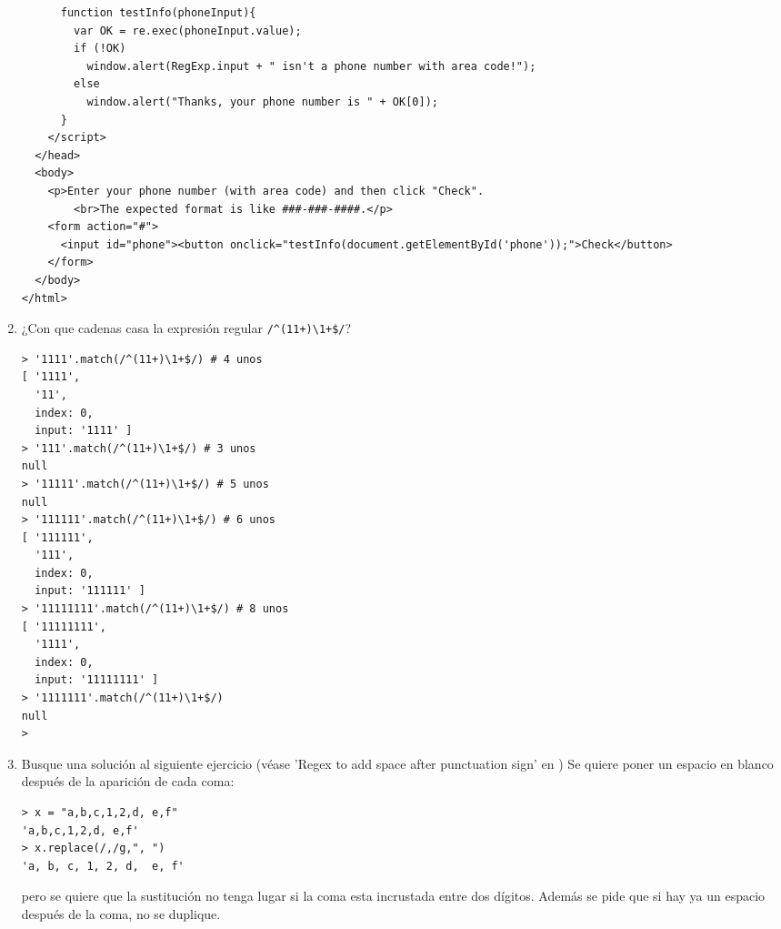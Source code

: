 \begin{enumerate}
\begin{verbatim}
      function testInfo(phoneInput){  
        var OK = re.exec(phoneInput.value);  
        if (!OK)  
          window.alert(RegExp.input + " isn't a phone number with area code!");  
        else
          window.alert("Thanks, your phone number is " + OK[0]);  
      }  
    </script>  
  </head>  
  <body>  
    <p>Enter your phone number (with area code) and then click "Check".
        <br>The expected format is like ###-###-####.</p>
    <form action="#">  
      <input id="phone"><button onclick="testInfo(document.getElementById('phone'));">Check</button>
    </form>  
  </body>  
</html>
\end{verbatim}
\item 
¿Con que cadenas casa  la expresión regular \verb|/^(11+)\1+$/|?
\begin{verbatim}
> '1111'.match(/^(11+)\1+$/) # 4 unos
[ '1111',
  '11',
  index: 0,
  input: '1111' ]
> '111'.match(/^(11+)\1+$/) # 3 unos
null
> '11111'.match(/^(11+)\1+$/) # 5 unos
null
> '111111'.match(/^(11+)\1+$/) # 6 unos
[ '111111',
  '111',
  index: 0,
  input: '111111' ]
> '11111111'.match(/^(11+)\1+$/) # 8 unos
[ '11111111',
  '1111',
  index: 0,
  input: '11111111' ]
> '1111111'.match(/^(11+)\1+$/)
null
> 
\end{verbatim}
\item

Busque  una solución al siguiente ejercicio 
(véase 'Regex to add space after punctuation sign' en )
Se quiere poner un espacio en blanco después de la aparición de cada coma:
\begin{verbatim}
> x = "a,b,c,1,2,d, e,f"
'a,b,c,1,2,d, e,f'
> x.replace(/,/g,", ")
'a, b, c, 1, 2, d,  e, f'
\end{verbatim}
pero se quiere que la sustitución no tenga lugar si la coma esta incrustada entre
dos dígitos. Además se pide que si hay ya un espacio después de la coma,
no se duplique.


\end{enumerate}
